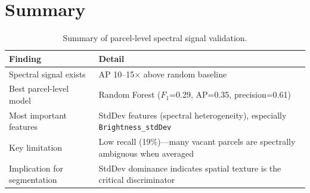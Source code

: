 \section{Summary}

\begin{table}[htbp]
  \centering
  \caption{Summary of parcel-level spectral signal validation.}
  \label{tab:spectral_summary}
  \begin{tabular}{p{4cm}p{9cm}}
    \toprule
    \textbf{Finding} & \textbf{Detail} \\
    \midrule
    Spectral signal exists & AP 10--15$\times$ above random baseline \\
    Best parcel-level model & Random Forest ($F_1$=0.29, AP=0.35, precision=0.61) \\
    Most important features & StdDev features (spectral heterogeneity), especially \texttt{Brightness\_stdDev} \\
    Key limitation & Low recall (19\%)---many vacant parcels are spectrally ambiguous when averaged \\
    Implication for segmentation & StdDev dominance indicates spatial texture is the critical discriminator \\
    \bottomrule
  \end{tabular}
\end{table}
